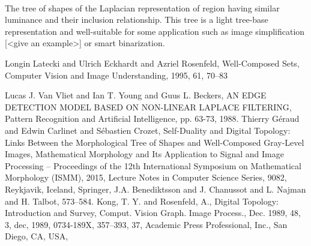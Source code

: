 \documentclass[12pt,a4paper]{report}
\begin{document}
\paragraph{}
The tree of shapes of the Laplacian representation of region having similar luminance and their inclusion relationship. This tree is a light tree-base representation and well-suitable for some application such as image simplification [<give an example>] or smart binarization. 




\begin{thebibliography}{9}
    {Longin Latecki and Ulrich Eckhardt and Azriel Rosenfeld},
    {Well-Composed Sets},
    {Computer Vision and Image Understanding},
    {1995},
    {61},
    {70--83}
    
	{Lucas J. Van Vliet and Ian T. Young and Guus L. Beckers},
    {AN EDGE DETECTION MODEL BASED ON NON-LINEAR LAPLACE FILTERING},
    Pattern Recognition and Artificial Intelligence,
    pp. 63-73,
    1988.  
  {Thierry G\'eraud and Edwin Carlinet and S\'ebastien Crozet},
  {Self-Duality and Digital Topology: Links Between the
		  Morphological Tree of Shapes and Well-Composed Gray-Level
		  Images},
  {Mathematical Morphology and Its Application to Signal and
		  Image Processing -- Proceedings of the 12th International
		  Symposium on Mathematical Morphology (ISMM)},
  {2015},
  {Lecture Notes in Computer Science Series},
  {9082},
  {Reykjavik, Iceland},
  {Springer},
  {J.A. Benediktsson and J. Chanussot and L. Najman and H.
		  Talbot},
  {573--584}.
	{Kong, T. Y. and Rosenfeld, A.},
	{Digital Topology: Introduction and Survey},
	{Comput. Vision Graph. Image Process.},
	{Dec. 1989},
	{48},
	{3},
	dec,
	{1989},
	{0734-189X},
	{357--393},
	{37},
	{Academic Press Professional, Inc.},
	{San Diego, CA, USA},    
    
\end{thebibliography}
\end{document}
